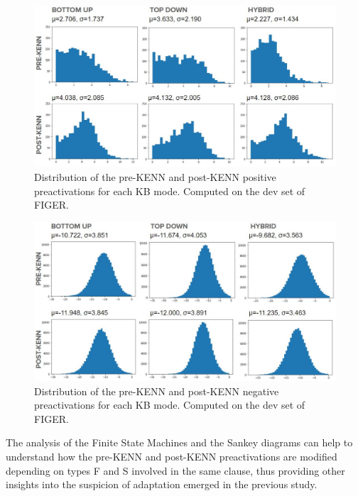 \begin{figure}[H]
    \centering
    \includegraphics[scale=.53]{figures/kenn_pos_distrib.JPG}
    \caption{Distribution of the pre-KENN and post-KENN positive preactivations for each KB mode. Computed on the dev set of FIGER.}
    \label{fig:kenn_pos_distrib}
\end{figure}

\begin{figure}[H]
    \centering
    \includegraphics[scale=.53]{figures/kenn_neg_distrib.JPG}
    \caption{Distribution of the pre-KENN and post-KENN negative preactivations for each KB mode. Computed on the dev set of FIGER.}
    \label{fig:kenn_neg_distrib}
\end{figure}

The analysis of the Finite State Machines and the Sankey diagrams can help to understand how the pre-KENN and post-KENN preactivations are modified depending on types F and S involved in the same clause, thus providing other insights into the suspicion of adaptation emerged in the previous study.

